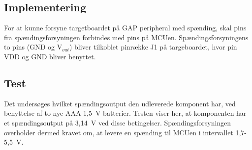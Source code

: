 \subsection{Implementering}
For at kunne forsyne targetboardet på GAP peripheral med spænding, skal pins fra spændingsforsyningen forbindes med pins på MCUen. 
Spændingsforsyningens to pins (GND og V$_{out}$) bliver tilkoblet pinrække J1 på targeboardet, hvor pin VDD og GND bliver benyttet.

\subsection{Test} 

Det undersøges hvilket spændingsoutput den udleverede komponent har, ved benyttelse af to nye AAA 1,5~V batterier. Testen viser her, at komponenten har et spændingsoutput på 3,14~V ved disse betingelser.\newline
Spændingsforsyningen overholder dermed kravet om, at levere en spænding til MCUen i intervallet 1,7-5,5~V. 





